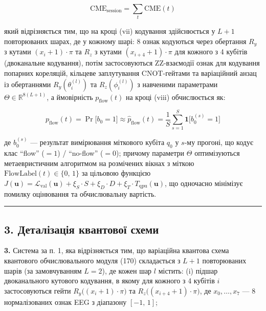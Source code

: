 \documentclass[12pt,a4paper]{article}
\begin{document}
\[\text{CME}_{\text{session}} = \sum_{t} \text{CME}(t)\]



який відрізняється тим, що на кроці (vii) кодування здійснюється у \(L + 1\) повторюваних шарах, де у кожному шарі: 8 ознак кодуються через обертання \(R_y\) з кутами \((x_i + 1) \cdot \pi\) та \(R_z\) з кутами \((x_{i+4} + 1) \cdot \pi\) для кожного з 4 кубітів (двоканальне кодування), потім застосовуються ZZ-взаємодії ознак для кодування попарних кореляцій, кільцеве заплутування CNOT-гейтами та варіаційний анзац із обертаннями \(R_y(\theta_i^{(l)})\) та \(R_z(\phi_i^{(l)})\) з навченими параметрами \(\Theta \in \mathbb{R}^{8(L+1)}\), а ймовірність \(p_{\text{flow}}(t)\) на кроці (viii) обчислюється як:



\[p_{\text{flow}}(t) = \Pr\bigl[b_0 = 1\bigr] \approx \hat{p}_{\text{flow}}(t) = \frac{1}{S}\sum_{s=1}^{S}\mathbf{1}\bigl[b_0^{(s)} = 1\bigr]\]



де \(b_0^{(s)}\) --- результат вимірювання міткового кубіта \(q_0\) у \(s\)-му прогоні, що кодує клас ``flow'' (\(= 1\)) / ``no-flow'' (\(= 0\)); причому параметри \(\Theta\) оптимізуються метаевристичним алгоритмом на розмічених вікнах з міткою \(\text{FlowLabel}(t) \in \{0,\,1\}\) за цільовою функцією \(J(\mathbf{u}) = \mathcal{L}_{\text{val}}(\mathbf{u}) + \xi_S \cdot S + \xi_D \cdot D + \xi_T \cdot T_{\text{qpu}}(\mathbf{u})\), що одночасно мінімізує помилку оцінювання та обчислювальну вартість.



\begin{center}\rule{0.5\linewidth}{0.5pt}\end{center}



\subsection{3. Деталізація квантової схеми}\label{ux434ux435ux442ux430ux43bux456ux437ux430ux446ux456ux44f-ux43aux432ux430ux43dux442ux43eux432ux43eux457-ux441ux445ux435ux43cux438}



\textbf{3.} Система за п. 1, яка відрізняється тим, що варіаційна квантова схема квантового обчислювального модуля (170) складається з \(L + 1\) повторюваних шарів (за замовчуванням \(L = 2\)), де кожен шар \(l\) містить: (i) підшар двоканального кутового кодування, в якому для кожного з 4 кубітів \(i\) застосовуються гейти \(R_y\bigl((x_i + 1) \cdot \pi\bigr)\) та \(R_z\bigl((x_{i+4} + 1) \cdot \pi\bigr)\), де \(x_0, \ldots, x_7\) --- 8 нормалізованих ознак EEG з діапазону \([-1,\,1]\);
\end{document}
